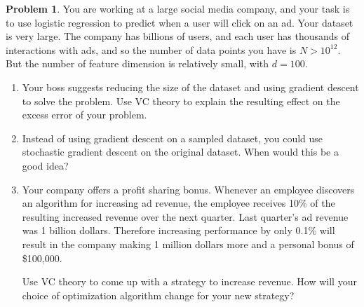 \documentclass[10pt]{exam}
\theoremstyle{definition}
\newtheorem{problem}{Problem}
\begin{document}
\newpage
\begin{problem}
    You are working at a large social media company,
    and your task is to use logistic regression to predict when a user will click on an ad.
    Your dataset is very large.
    The company has billions of users, and each user has thousands of interactions with ads, and so the number of data points you have is $N>10^{12}$.
    But the number of feature dimension is relatively small, with $d=100$.

    \begin{enumerate}
        \item
            Your boss suggests reducing the size of the dataset and using gradient descent to solve the problem.
            Use VC theory to explain the resulting effect on the excess error of your problem.

        \vspace{4in}
        \item
            Instead of using gradient descent on a sampled dataset, you could use stochastic gradient descent on the original dataset.
            When would this be a good idea?

        \vspace{4in}
        \item
            Your company offers a profit sharing bonus.
            Whenever an employee discovers an algorithm for increasing ad revenue,
            the employee receives 10\% of the resulting increased revenue over the next quarter.
            Last quarter's ad revenue was 1 billion dollars.
            Therefore increasing performance by only 0.1\% will result in the company making 1 million dollars more and a personal bonus of \$100,000.

            Use VC theory to come up with a strategy to increase revenue.
            How will your choice of optimization algorithm change for your new strategy?
    \end{enumerate}
\end{problem}

\clearpage
~
\end{document}

